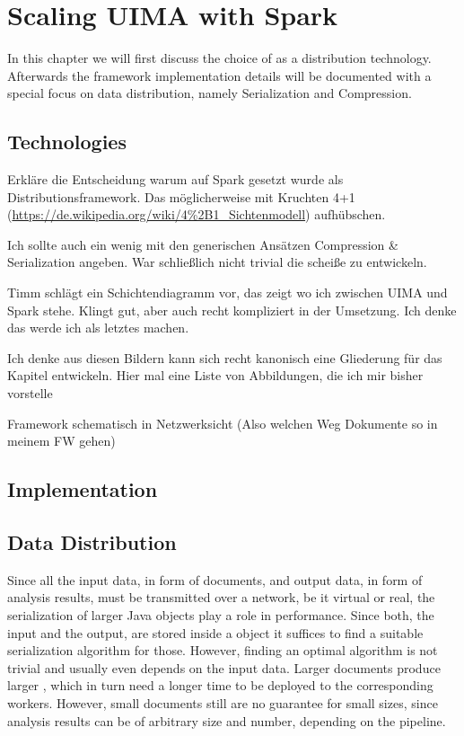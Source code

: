 \chapter{Scaling UIMA with Spark}
\label{ch:implementation}
In this chapter we will first discuss the choice of \spark{} as a distribution technology. Afterwards the framework implementation details will be documented with a special focus on data distribution, namely Serialization and Compression.
\section{Technologies}


Erkläre die Entscheidung warum auf Spark gesetzt wurde als Distributionsframework. Das möglicherweise mit Kruchten 4+1 (\url{https://de.wikipedia.org/wiki/4\%2B1_Sichtenmodell})  aufhübschen.

Ich sollte auch ein wenig mit den generischen Ansätzen Compression \& Serialization angeben. War schließlich nicht trivial die scheiße zu entwickeln.

Timm schlägt ein Schichtendiagramm vor, das zeigt wo ich zwischen UIMA und Spark stehe. Klingt gut, aber auch recht kompliziert in der Umsetzung. Ich denke das werde ich als letztes machen.

Ich denke aus diesen Bildern kann sich recht kanonisch eine Gliederung für das Kapitel entwickeln. Hier mal eine Liste von Abbildungen, die ich mir bisher vorstelle

Framework schematisch in Netzwerksicht (Also welchen Weg Dokumente so in meinem FW gehen)



\section{Implementation}


\section{Data Distribution}
Since all the input data, in form of documents, and output data, in form of analysis results, must be transmitted over a network, be it virtual or real, the serialization of larger Java objects play a role in performance. Since both, the input and the output, are stored inside a \cas{} object it suffices to find a suitable serialization algorithm for those. However, finding an optimal algorithm is not trivial and usually even depends on the input data. Larger documents produce larger \cas{}, which in turn need a longer time to be deployed to the corresponding \spark{} workers. However, small documents still are no guarantee for small \cas{} sizes, since analysis results can be of arbitrary size and number, depending on the \uima{} pipeline. 

